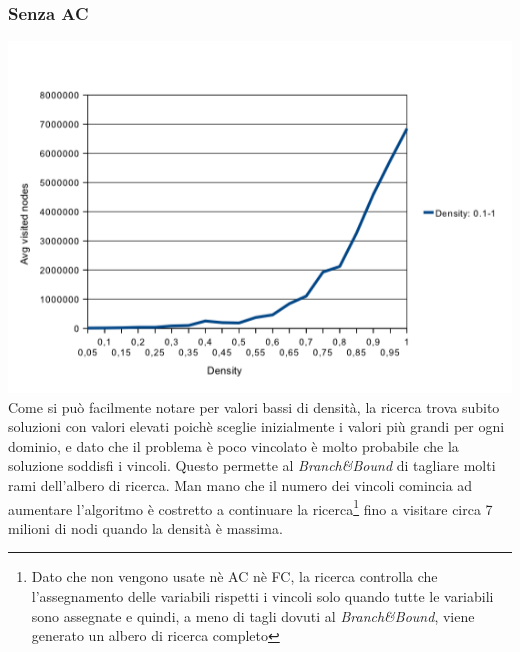 \documentclass[a4paper,12pt,italian]{article}
\begin{document}
\subsubsection{Senza AC}
\includegraphics[scale=0.6]{dens.png}
\\
Come si pu\`o facilmente notare per valori bassi di densit\`a, la
ricerca trova
subito soluzioni con valori elevati poich\`e sceglie inizialmente i valori
pi\`u grandi per ogni dominio, e dato che il problema \`e poco vincolato \`e
molto probabile che la soluzione soddisfi i vincoli. Questo permette
al \textit{Branch\&Bound} di tagliare molti rami dell'albero di
ricerca. Man mano che il numero dei vincoli comincia ad
aumentare l'algoritmo \`e costretto a continuare la ricerca\footnote{Dato che non vengono usate n\`e AC n\`e FC, la ricerca
  controlla che l'assegnamento delle variabili rispetti i vincoli solo
quando tutte le variabili sono assegnate e quindi, a meno di tagli
dovuti al \textit{Branch\&Bound}, viene generato un albero di ricerca completo} fino a visitare circa 7 milioni di nodi quando la densit\`a \`e massima.
\end{document}
